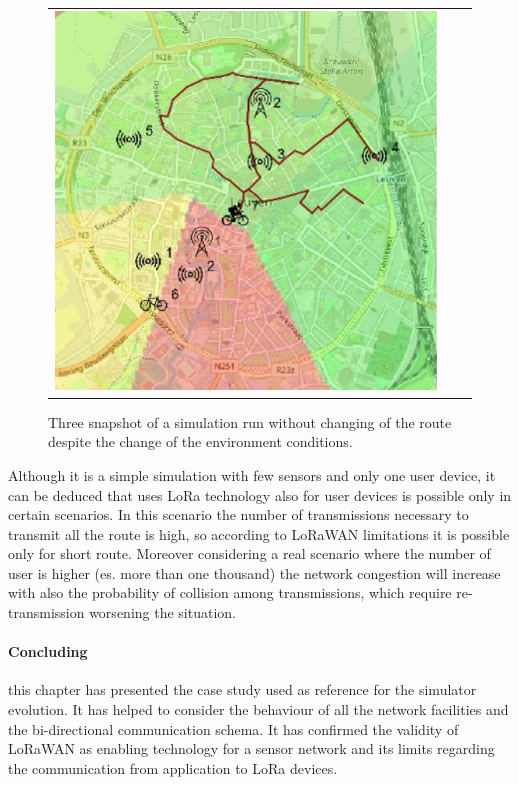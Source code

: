 \begin{figure}[h]
\begin{tabular}{lll}
         \includegraphics[scale=0.42]{figures/sim2snap3.png} 
    \end{tabular}
    \caption[Three snapshot of a simulation run without changing of the route]{Three snapshot of a simulation run without changing of the route despite the change of the environment conditions.}
    \label{fig:sim2}
\end{figure}
% 

Although it is a simple simulation with few sensors and only one user device, it can be deduced that uses LoRa technology also for user devices is possible only in certain scenarios.
In this scenario the number of transmissions necessary to transmit all the route is high, so according to LoRaWAN limitations it is possible only for short route.
Moreover considering a real scenario where the number of user is higher (es. more than one thousand) the network congestion will increase with also the probability of collision among transmissions, which require re-transmission worsening the situation.

\paragraph{Concluding} this chapter has presented the case study used as reference for the simulator evolution.
It has helped to consider the behaviour of all the network facilities and the bi-directional communication schema.
It has confirmed the validity of LoRaWAN as enabling technology for a sensor network and its limits regarding the communication from application to LoRa devices.